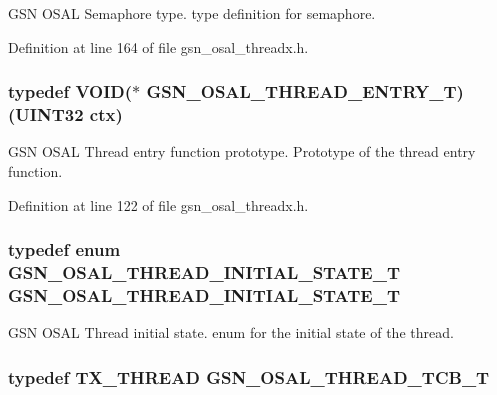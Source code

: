 GSN OSAL Semaphore type. type definition for semaphore. 



Definition at line 164 of file gsn\_\-osal\_\-threadx.h.

\hypertarget{a00628_ga62a09641cac90719fc0cdb5f204df09b}{
\subsubsection[{GSN\_\-OSAL\_\-THREAD\_\-ENTRY\_\-T}]{\setlength{\rightskip}{0pt plus 5cm}typedef VOID($\ast$ {\bf GSN\_\-OSAL\_\-THREAD\_\-ENTRY\_\-T})({\bf UINT32} ctx)}}
\label{a00628_ga62a09641cac90719fc0cdb5f204df09b}


GSN OSAL Thread entry function prototype. Prototype of the thread entry function. 



Definition at line 122 of file gsn\_\-osal\_\-threadx.h.

\hypertarget{a00628_gab9843a3f99a06459775b3380ed83f17d}{
\subsubsection[{GSN\_\-OSAL\_\-THREAD\_\-INITIAL\_\-STATE\_\-T}]{\setlength{\rightskip}{0pt plus 5cm}typedef enum {\bf GSN\_\-OSAL\_\-THREAD\_\-INITIAL\_\-STATE\_\-T} {\bf GSN\_\-OSAL\_\-THREAD\_\-INITIAL\_\-STATE\_\-T}}}
\label{a00628_gab9843a3f99a06459775b3380ed83f17d}


GSN OSAL Thread initial state. enum for the initial state of the thread. 

\hypertarget{a00628_ga43c1eefe78fa26e478301976f96ac31f}{
\subsubsection[{GSN\_\-OSAL\_\-THREAD\_\-TCB\_\-T}]{\setlength{\rightskip}{0pt plus 5cm}typedef TX\_\-THREAD {\bf GSN\_\-OSAL\_\-THREAD\_\-TCB\_\-T}}}
\label{a00628_ga43c1eefe78fa26e478301976f96ac31f}


